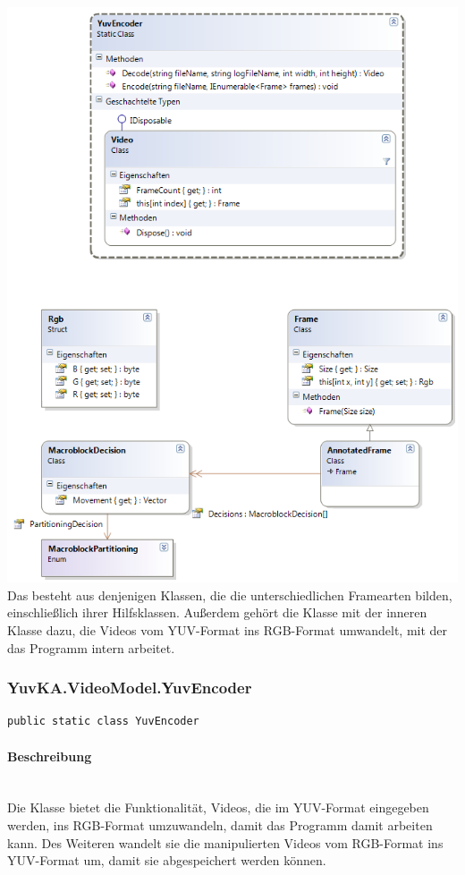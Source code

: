 \includegraphics[width=\textwidth]{YuvKA.VideoModel/videomodel.png}
Das  besteht aus denjenigen Klassen, die die unterschiedlichen Framearten bilden, einschließlich ihrer Hilfsklassen. Außerdem gehört die Klasse  mit der inneren Klasse  dazu, die Videos vom YUV-Format ins RGB-Format umwandelt, mit der das Programm intern arbeitet.

\subsubsection{YuvKA.VideoModel.YuvEncoder}

\begin{verbatim}
public static class YuvEncoder
\end{verbatim}

\paragraph{Beschreibung}~\\
Die Klasse  bietet die Funktionalität, Videos, die im YUV-Format eingegeben werden, ins RGB-Format umzuwandeln, damit das Programm damit arbeiten kann. Des Weiteren wandelt sie die manipulierten Videos vom RGB-Format ins YUV-Format um, damit sie abgespeichert werden können.

